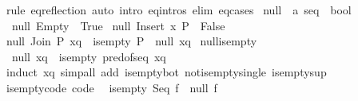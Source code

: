 \begin{isabellebody}
\isamarkupfalse%
\ {\isacharparenleft}{\kern0pt}rule\ eq{\isacharunderscore}{\kern0pt}reflection{\isacharparenright}{\kern0pt}\ {\isacharparenleft}{\kern0pt}auto\ intro{\isacharcolon}{\kern0pt}\ eq{\isachardot}{\kern0pt}intros\ elim{\isacharcolon}{\kern0pt}\ eq{\isachardot}{\kern0pt}cases{\isacharparenright}{\kern0pt}%
\endisatagproof
{\isafoldproof}%
%
\isadelimproof
\isanewline
%
\endisadelimproof
\isanewline
{}\isamarkupfalse%
\ null\ {\isacharcolon}{\kern0pt}{\isacharcolon}{\kern0pt}\ {\isachardoublequoteopen}{\isacharprime}{\kern0pt}a\ seq\ {\isasymRightarrow}\ bool{\isachardoublequoteclose}\ \isanewline
\ \ {\isachardoublequoteopen}null\ Empty\ {\isasymlongleftrightarrow}\ True{\isachardoublequoteclose}\isanewline
{\isacharbar}{\kern0pt}\ {\isachardoublequoteopen}null\ {\isacharparenleft}{\kern0pt}Insert\ x\ P{\isacharparenright}{\kern0pt}\ {\isasymlongleftrightarrow}\ False{\isachardoublequoteclose}\isanewline
{\isacharbar}{\kern0pt}\ {\isachardoublequoteopen}null\ {\isacharparenleft}{\kern0pt}Join\ P\ xq{\isacharparenright}{\kern0pt}\ {\isasymlongleftrightarrow}\ is{\isacharunderscore}{\kern0pt}empty\ P\ {\isasymand}\ null\ xq{\isachardoublequoteclose}\isanewline
\isanewline
{}\isamarkupfalse%
\ null{\isacharunderscore}{\kern0pt}is{\isacharunderscore}{\kern0pt}empty{\isacharcolon}{\kern0pt}\isanewline
\ \ {\isachardoublequoteopen}null\ xq\ {\isasymlongleftrightarrow}\ is{\isacharunderscore}{\kern0pt}empty\ {\isacharparenleft}{\kern0pt}pred{\isacharunderscore}{\kern0pt}of{\isacharunderscore}{\kern0pt}seq\ xq{\isacharparenright}{\kern0pt}{\isachardoublequoteclose}\isanewline
%
\isadelimproof
\ \ %
\endisadelimproof
%
\isatagproof
{}\isamarkupfalse%
\ {\isacharparenleft}{\kern0pt}induct\ xq{\isacharparenright}{\kern0pt}\ {\isacharparenleft}{\kern0pt}simp{\isacharunderscore}{\kern0pt}all\ add{\isacharcolon}{\kern0pt}\ is{\isacharunderscore}{\kern0pt}empty{\isacharunderscore}{\kern0pt}bot\ not{\isacharunderscore}{\kern0pt}is{\isacharunderscore}{\kern0pt}empty{\isacharunderscore}{\kern0pt}single\ is{\isacharunderscore}{\kern0pt}empty{\isacharunderscore}{\kern0pt}sup{\isacharparenright}{\kern0pt}%
\endisatagproof
{\isafoldproof}%
%
\isadelimproof
\isanewline
%
\endisadelimproof
\isanewline
{}\isamarkupfalse%
\ is{\isacharunderscore}{\kern0pt}empty{\isacharunderscore}{\kern0pt}code\ {\isacharbrackleft}{\kern0pt}code{\isacharbrackright}{\kern0pt}{\isacharcolon}{\kern0pt}\isanewline
\ \ {\isachardoublequoteopen}is{\isacharunderscore}{\kern0pt}empty\ {\isacharparenleft}{\kern0pt}Seq\ f{\isacharparenright}{\kern0pt}\ {\isasymlongleftrightarrow}\ null\ {\isacharparenleft}{\kern0pt}f\ {\isacharparenleft}{\kern0pt}{\isacharparenright}{\kern0pt}{\isacharparenright}{\kern0pt}{\isachardoublequoteclose}\isanewline

\end{isabellebody}
